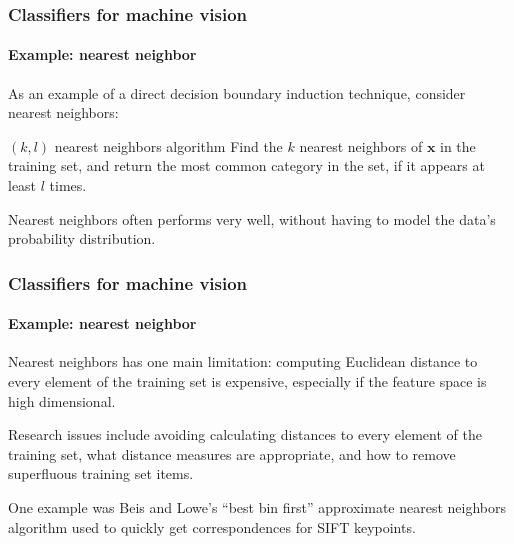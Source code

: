 \documentclass[aspectratio=169]{beamer}
\renewcommand{\vec}[1]{\boldsymbol{#1}}
\begin{document}
\begin{frame}
\frametitle{Classifiers for machine vision}
\framesubtitle{Example: nearest neighbor}

As an example of a direct decision boundary induction technique,
consider \alert{nearest neighbors}:
\begin{block}{$(k,l)$ nearest neighbors algorithm}
Find the
$k$ nearest neighbors of $\vec{x}$ in the training set, and return the
most common category in the set, if it appears at least $l$ times.
\end{block}

\medskip

Nearest neighbors often performs very well, \alert{without having to
  model} the data's probability distribution.

\end{frame}

\begin{frame}
\frametitle{Classifiers for machine vision}
\framesubtitle{Example: nearest neighbor}

Nearest neighbors has one main limitation: computing Euclidean
distance to \alert{every element} of the training set is expensive,
especially if the feature space is high dimensional.

\medskip

Research issues include avoiding calculating distances to every
element of the training set, what distance measures are appropriate,
and how to remove superfluous training set items.

\medskip

One example was Beis and Lowe's ``best bin first'' approximate nearest
neighbors algorithm used to quickly get correspondences for SIFT keypoints.

\end{frame}
\end{document}
